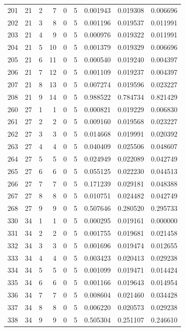 \begin{longtable}{rrrrrrrrr}
201 & 21 & 2 & 7 & 0 & 5 & 0.001943 & 0.019308 & 0.006696 \\
202 & 21 & 3 & 8 & 0 & 5 & 0.001196 & 0.019537 & 0.011991 \\
203 & 21 & 4 & 9 & 0 & 5 & 0.000976 & 0.019322 & 0.011991 \\
204 & 21 & 5 & 10 & 0 & 5 & 0.001379 & 0.019329 & 0.006696 \\
205 & 21 & 6 & 11 & 0 & 5 & 0.000540 & 0.019240 & 0.004397 \\
206 & 21 & 7 & 12 & 0 & 5 & 0.001109 & 0.019237 & 0.004397 \\
207 & 21 & 8 & 13 & 0 & 5 & 0.007274 & 0.019596 & 0.023227 \\
208 & 21 & 9 & 14 & 0 & 5 & 0.988522 & 0.784734 & 0.821429 \\
260 & 27 & 1 & 1 & 0 & 5 & 0.000821 & 0.019229 & 0.006830 \\
261 & 27 & 2 & 2 & 0 & 5 & 0.009160 & 0.019568 & 0.023227 \\
262 & 27 & 3 & 3 & 0 & 5 & 0.014668 & 0.019991 & 0.020392 \\
263 & 27 & 4 & 4 & 0 & 5 & 0.040409 & 0.025506 & 0.048607 \\
264 & 27 & 5 & 5 & 0 & 5 & 0.024949 & 0.022089 & 0.042749 \\
265 & 27 & 6 & 6 & 0 & 5 & 0.055125 & 0.022230 & 0.044513 \\
266 & 27 & 7 & 7 & 0 & 5 & 0.171239 & 0.029181 & 0.048388 \\
267 & 27 & 8 & 8 & 0 & 5 & 0.010751 & 0.024482 & 0.042749 \\
268 & 27 & 9 & 9 & 0 & 5 & 0.507646 & 0.280520 & 0.295733 \\
330 & 34 & 1 & 1 & 0 & 5 & 0.000295 & 0.019161 & 0.000000 \\
331 & 34 & 2 & 2 & 0 & 5 & 0.001755 & 0.019681 & 0.021458 \\
332 & 34 & 3 & 3 & 0 & 5 & 0.001696 & 0.019474 & 0.012655 \\
333 & 34 & 4 & 4 & 0 & 5 & 0.003423 & 0.020413 & 0.029238 \\
334 & 34 & 5 & 5 & 0 & 5 & 0.001099 & 0.019471 & 0.014424 \\
335 & 34 & 6 & 6 & 0 & 5 & 0.001166 & 0.019643 & 0.014954 \\
336 & 34 & 7 & 7 & 0 & 5 & 0.008604 & 0.021460 & 0.034428 \\
337 & 34 & 8 & 8 & 0 & 5 & 0.006220 & 0.020573 & 0.029238 \\
338 & 34 & 9 & 9 & 0 & 5 & 0.505304 & 0.251107 & 0.246610 \\

\end{longtable}

